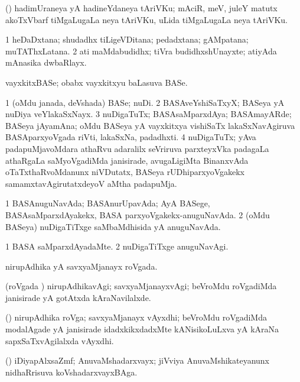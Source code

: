 \bentry
{}
\gl{\nA}
\bmng
(\bava) hadimUraneya yA hadineYdaneya tAriVKu; mAciR, meV, juleY matutx akoTxVbarf tiMgaLugaLa neya tAriVKu, uLida tiMgaLugaLa neya tAriVKu. 
\emng
\eentry

\bentry
{}
\gl{\nA}
\bmng
\bnum
\num{1} heDaDxtana; shudadhx tiLigeVDitana; pedadxtana; gAMpatana; muTAThxLatana. 
\num{2} ati maMdabudidhx; tiVra budidhxshUnayxte; atiyAda mAnasika dwbaRlayx. 
\enum
\emng
\eentry

\bentry
{}
\gl{\nA}
\bmng
vayxkitxBASe; obabx vayxkitxyu baLasuva BASe. 
\emng
\eentry

\bentry
{}
\gl{\nA}
\bmng
\bnum
\num{1} (oMdu janada, deVshada) BASe; nuDi. 
\num{2} BASAveYshiSaTxyX; BASeya yA nuDiya veYlakaSxNayx. 
\num{3} nuDigaTuTx; BASAsaMparxdAya; BASAmayARde; BASeya jAyamAna; oMdu BASeya yA vayxkitxya vishiSaTx lakaSxNavAgiruva BASAparxyoVgada riVti, lakaSxNa, padadhxti. 
\num{4} nuDigaTuTx; yAva padapuMjavoMdara athaRvu adaralilx seVriruva parxteyxVka padagaLa athaRgaLa saMyoVgadiMda janisirade, avugaLigiMta BinanxvAda oTaTxthaRvoMdanunx niVDutatx, BASeya rUDhiparxyoVgakekx samamxtavAgirutatxdeyoV aMtha padapuMja. 
\enum
\emng
\eentry

\bentry
{}
\gl{\gu}
\bmng
\bnum
\num{1} BASAnuguNavAda; BASAnurUpavAda; AyA BASege, BASAsaMparxdAyakekx, BASA parxyoVgakekx-anuguNavAda. 
\num{2} (oMdu BASeya) nuDigaTiTxge saMbaMdhisida yA anuguNavAda. 
\enum
\emng
\eentry

\bentry
{}
\gl{\kirxvi}
\bmng
\bnum
\num{1} BASA saMparxdAyadaMte. 
\num{2} nuDigaTiTxge anuguNavAgi. 
\enum
\emng
\eentry

\bentry
{}
\gl{\gu}
\bmng
nirupAdhika yA savxyaMjanayx roVgada. 
\emng
\eentry

\bentry
{}
\gl{\kirxvi}
\bmng
(roVgada \vi) nirupAdhikavAgi; savxyaMjanayxvAgi; beVroMdu roVgadiMda janisirade yA gotAtxda kAraNavilalxde. 
\emng
\eentry

\bentry
{}
\gl{\nA}
\bmng
(\roVshA) nirupAdhika roVga; savxyaMjanayx vAyxdhi; beVroMdu roVgadiMda modalAgade yA janisirade idadxkikxdadxMte kANisikoLuLxva yA kAraNa sapxSaTxvAgilalxda vAyxdhi. 
\emng
\eentry

\bentry
{}
\gl{\nA}
\bmng
(\jiVvi) iDiyapAlxsaZmf; AnuvaMshadarxvayx; jiVviya AnuvaMshikateyanunx nidhaRrisuva koVshadarxvayxBAga. 
\emng
\eentry


